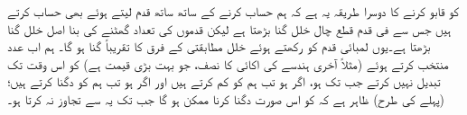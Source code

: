  کو قابو کرنے کا دوسرا طریقہ یہ ہے کہ ہم حساب کرنے کے ساتھ ساتھ قدم  لیتے ہوئے بھی حساب کرتے ہیں جس سے فی قدم قطع چال خلل
   گنا بڑھتا ہے لیکن قدموں کی تعداد گھٹنے کی بنا اصل خلل  گنا بڑھتا ہے۔یوں لمبائی قدم  کو  رکھتے ہوئے خلل مطابقتی  کے فرق   کا تقریباً  گنا ہو گا۔ ہم اب عدد  منتخب کرتے ہوئے (مثلاً آخری ہندسے کی اکائی کا نصف، جو بہت بڑی قیمت ہے)  کو اس وقت تک تبدیل نہیں کرتے جب تک  ہو، اگر  ہو تب ہم  کو  کم کرتے ہیں اور اگر  ہو تب ہم  کو دگنا کرتے ہیں؛ (پہلے کی طرح) ظاہر ہے کہ  کو اس صورت دگنا کرنا ممکن ہو گا جب تک یہ  سے تجاوز نہ کرتا ہو۔


